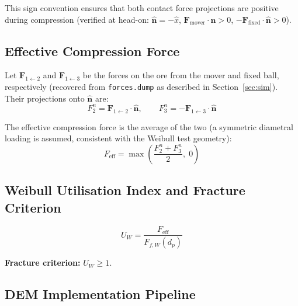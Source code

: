 \documentclass{article}
\begin{document}
This sign convention ensures that both contact force projections are positive
during compression (verified at head-on: $\hat{\mathbf{n}} = -\hat{x}$,
$\mathbf{F}_{\text{mover}}\cdot\hat{\mathbf{n}} > 0$,
$-\mathbf{F}_{\text{fixed}}\cdot\hat{\mathbf{n}} > 0$).

\subsection{Effective Compression Force}

Let $\mathbf{F}_{1\leftarrow2}$ and $\mathbf{F}_{1\leftarrow3}$ be the forces on
the ore from the mover and fixed ball, respectively (recovered from \texttt{forces.dump}
as described in Section~\ref{sec:sim}).  Their projections onto $\hat{\mathbf{n}}$ are:
\begin{equation}
    F_2^n = \mathbf{F}_{1\leftarrow2}\cdot\hat{\mathbf{n}}, \qquad
    F_3^n = -\mathbf{F}_{1\leftarrow3}\cdot\hat{\mathbf{n}}
\end{equation}

The effective compression force is the average of the two (a symmetric diametral
loading is assumed, consistent with the Weibull test geometry):
\begin{equation}
    F_{\text{eff}} = \max\!\left(\frac{F_2^n + F_3^n}{2},\; 0\right)
\end{equation}

\subsection{Weibull Utilisation Index and Fracture Criterion}

\begin{equation}
    U_W = \frac{F_{\text{eff}}}{F_{f,W}(d_p)}
\end{equation}

\noindent\textbf{Fracture criterion:} $U_W \geq 1$.

\subsection{DEM Implementation Pipeline}
\end{document}
